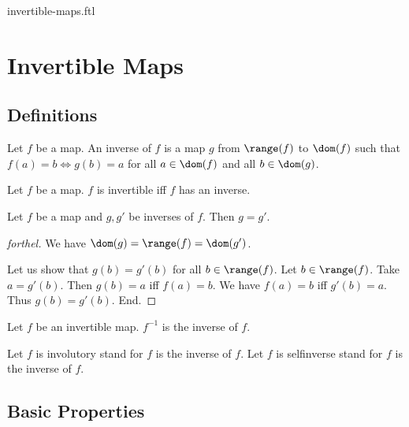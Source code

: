 \documentclass{naproche-library}
\begin{document}
\begin{smodule}{invertible-maps.ftl}

  \section*{Invertible Maps}

  \subsection*{Definitions}

  \begin{definition}[forthel,id=FOUNDATIONS_09_7776974319648768]
    Let $f$ be a map.
    An inverse of $f$ is a map $g$ from $\range(f)$ to $\dom(f)$ such that $f(a) = b \iff g(b) = a$ for all $a \in \dom(f)$ and all $b \in \dom(g)$.
  \end{definition}

  \begin{definition}[forthel,id=FOUNDATIONS_09_3430350086733824]
    Let $f$ be a map.
    $f$ is invertible iff $f$ has an inverse.
  \end{definition}

  \begin{lemma}[forthel,id=FOUNDATIONS_09_5108611793551360]
    Let $f$ be a map and $g, g'$ be inverses of $f$.
    Then $g = g'$.
  \end{lemma}
  \begin{proof}[forthel]
    We have $\dom(g) = \range(f) = \dom(g')$.

    Let us show that $g(b) = g'(b)$ for all $b \in \range(f)$.
      Let $b \in \range(f)$.
      Take $a = g'(b)$.
      Then $g(b) = a$ iff $f(a) = b$.
      We have $f(a) = b$ iff $g'(b) = a$.
      Thus $g(b) = g'(b)$.
    End.
  \end{proof}

  \begin{definition}[forthel,id=FOUNDATIONS_09_6458627204317184]
    Let $f$ be an invertible map.
    $f^{-1}$ is the inverse of $f$.

    Let $f$ is involutory stand for $f$ is the inverse of $f$.
    Let $f$ is selfinverse stand for $f$ is the inverse of $f$.
  \end{definition}


  \subsection*{Basic Properties}


\end{smodule}
\end{document}
